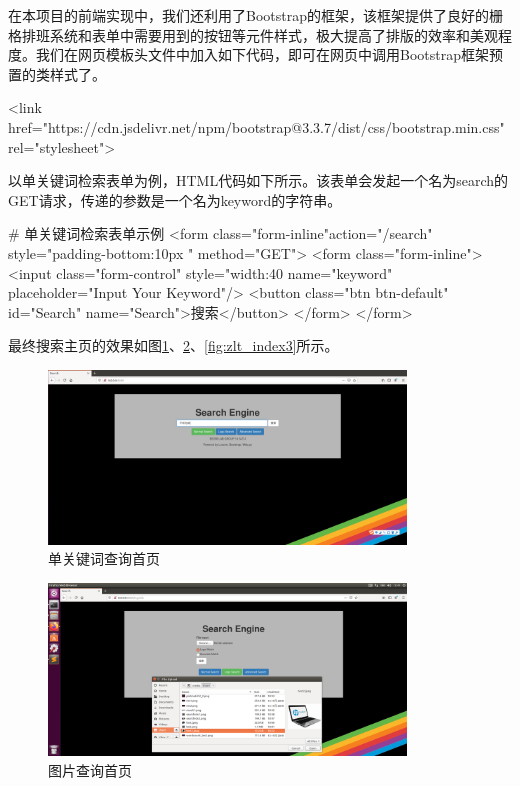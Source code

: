 在本项目的前端实现中，我们还利用了Bootstrap的框架，该框架提供了良好的栅格排班系统和表单中需要用到的按钮等元件样式，极大提高了排版的效率和美观程度。我们在网页模板头文件中加入如下代码，即可在网页中调用Bootstrap框架预置的类样式了。

\begin{python}
<link href="https://cdn.jsdelivr.net/npm/bootstrap@3.3.7/dist/css/bootstrap.min.css" rel="stylesheet">
\end{python}

以单关键词检索表单为例，HTML代码如下所示。该表单会发起一个名为search的GET请求，传递的参数是一个名为keyword的字符串。

\begin{python}
# 单关键词检索表单示例
<form class="form-inline"action="/search" style="padding-bottom:10px " method="GET">
	<form class="form-inline">
	<input class="form-control"  style="width:40%
		   name="keyword" placeholder="Input Your Keyword"/>
	<button class="btn btn-default" id="Search" name="Search">搜索</button>
	</form>
</form>
\end{python}

最终搜索主页的效果如图\ref{fig:zlt_index1}、\ref{fig:zlt_index2}、\ref{fig:zlt_index3}所示。


\begin{figure}[htbp]
\centering
\includegraphics[width=9.5cm]{img/zlt/searchidx1.png}
\caption{单关键词查询首页}
\label{fig:zlt_index1}
\end{figure}

\begin{figure}[htbp]
\centering
\includegraphics[width=9.5cm]{img/zlt/searchidx2.png}
\caption{图片查询首页}
\label{fig:zlt_index2}
\end{figure}

